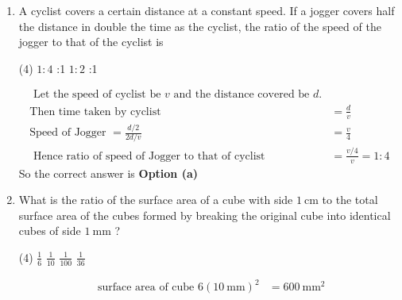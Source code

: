 \begin{enumerate}
\begin{answer}
\begin{align*}
	\text{But the second digits of }(a b c 6)^{2}&\text{ is always 1 or 3 or 5 or 7}\\
	\text{Suppose }B&=2 x y z 175=(x y z 5)^{2}\\
\text{	But the second last digit of }&(x y z 5)^{2}\text{ is always 2}\\
\text{Suppose }C&=x y z 3310=(p q r 0)^{2}\\
\text{But the second last digit of }&(p q r 0)^{2}\text{ is always 0}
\intertext{Since all three numbers $A, B$ and $C$ do not satisfy the requirements for a perfect square, none of them is a perfect square. Hence the correct option is (d)}
	\end{align*}
	So the correct answer is \textbf{Option (d)}
\end{answer}
\item  A cyclist covers a certain distance at a constant speed. If a jogger covers half the distance in double the time as the cyclist, the ratio of the speed of the jogger to that of the cyclist is
 \begin{tasks}(4)
	\task[\textbf{a.}] $1: 4$
	:1
	\task[\textbf{c.}] $1: 2$
	:1
\end{tasks}
\begin{answer}
	\begin{align*}
	\text{ Let the speed of cyclist be $v$ and the distance covered be $d$.}\\
	\text{Then time taken by cyclist }&=\frac{d}{v}\\
	\text{Speed of Jogger }=\frac{d / 2}{2 d / v}&=\frac{v}{4}\\
\text{	Hence ratio of speed of Jogger to that of cyclist }&=\frac{v / 4}{v}=1: 4
	\end{align*}
		So the correct answer is \textbf{Option (a)}
\end{answer}
\item  What is the ratio of the surface area of a cube with side $1 \mathrm{~cm}$ to the total surface area of the cubes formed by breaking the original cube into identical cubes of side $1 \mathrm{~mm}$ ?
 \begin{tasks}(4)
	\task[\textbf{a.}]$\frac{1}{6}$
	\task[\textbf{b.}]$\frac{1}{10}$
	\task[\textbf{c.}]$\frac{1}{100}$
	\task[\textbf{d.}]$\frac{1}{36}$ 
\end{tasks}	
\begin{answer}
	\begin{align*}
\text{	surface area of cube $6(10 \mathrm{~mm})^{2}$}&=600 \mathrm{~mm}^{2}\\

\end{align*}
\end{answer}
\end{enumerate}
